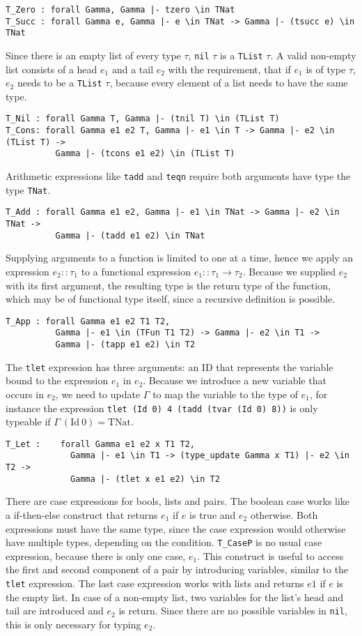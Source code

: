 \documentclass[fleqn]{scrreprt}
\newcommand{\coqinline}[1]{\texttt{#1}}
\begin{document}
\begin{verbatim}
T_Zero : forall Gamma, Gamma |- tzero \in TNat
T_Succ : forall Gamma e, Gamma |- e \in TNat -> Gamma |- (tsucc e) \in TNat
\end{verbatim}
Since there is an empty list of every type $\tau$, \coqinline{nil} $\tau$ is a \coqinline{TList} $\tau$. A valid non-empty list consists of a head $e_{1}$ and a tail $e_{2}$ with the requirement, that if $e_{1}$ is of type $\tau$, $e_{2}$ needs to be a \coqinline{TList} $\tau$, because every element of a list needs to have the same type. 
\begin{verbatim}
T_Nil : forall Gamma T, Gamma |- (tnil T) \in (TList T)
T_Cons: forall Gamma e1 e2 T, Gamma |- e1 \in T -> Gamma |- e2 \in (TList T) -> 
          Gamma |- (tcons e1 e2) \in (TList T)
\end{verbatim}
Arithmetic expressions like \coqinline{tadd} and \coqinline{teqn} require both arguments have type the type \coqinline{TNat}.
\begin{verbatim}
T_Add : forall Gamma e1 e2, Gamma |- e1 \in TNat -> Gamma |- e2 \in TNat ->
          Gamma |- (tadd e1 e2) \in TNat
\end{verbatim}
Supplying arguments to a function is limited to one at a time, hence we apply an expression $e_{2} :: \tau_{1}$ to a functional expression $e_{1} :: \tau_{1} \rightarrow \tau_{2}$. Because we supplied $e_{2}$ with its first argument, the resulting type is the return type of the function, which may be of functional type itself, since a recursive definition is possible.
\begin{verbatim}
T_App : forall Gamma e1 e2 T1 T2,
          Gamma |- e1 \in (TFun T1 T2) -> Gamma |- e2 \in T1 ->
          Gamma |- (tapp e1 e2) \in T2
\end{verbatim}
The \coqinline{tlet} expression has three arguments: an ID that represents the variable bound to the expression $e_{1}$ in $e_{2}$. Because we introduce a new variable that occurs in $e_{2}$, we need to update $\Gamma$ to map the variable to the type of $e_{1}$, for instance the expression \coqinline{tlet (Id 0) 4 (tadd (tvar (Id 0) 8))} is only typeable if $\Gamma \:(\text{Id}\: 0) = \text{TNat}$.
\begin{verbatim}
T_Let :    forall Gamma e1 e2 x T1 T2,
             Gamma |- e1 \in T1 -> (type_update Gamma x T1) |- e2 \in T2 ->
             Gamma |- (tlet x e1 e2) \in T2
\end{verbatim}
There are case expressions for bools, lists and pairs. The boolean case works like a if-then-else construct that returns $e_{1}$ if $e$ is true and $e_{2}$ otherwise. Both expressions must have the same type, since the case expression would otherwise have multiple types, depending on the condition. \coqinline{T_CaseP} is no usual case expression, because there is only one case, $e_{1}$. This construct is useful to access the first and second component of a pair by introducing variables, similar to the \coqinline{tlet} expression. The last case expression works with lists and returns $e1$ if $e$ is the empty list. In case of a non-empty list, two variables for the list's head and tail are introduced and $e_{2}$ is return. Since there are no possible variables in \coqinline{nil}, this is only necessary for typing $e_{2}$.
\end{document}
